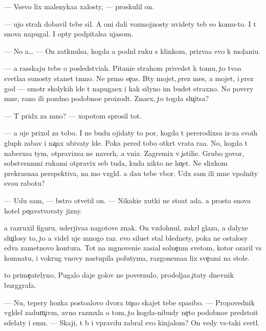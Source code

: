 \documentclass[10pt]{book}
\begin{document}
— Vsevo lix malenyka{\y}a xalosty, — proskulil on.

— {\C}ujo{\y} strah dobavil tebe sil. A oni dali vozmojnosty uvidety teb{\ia} {\y}e{\x}o komu-to. I t{\yi} snova napugal. I op{\ia}ty podpitalsa ujasom.

— No {\y}a… — On zatknulsa, kogda {\y}a podn{\ia}l ruku s klinkom, priz{\yi}va{\y}a {\y}evo k mol{\c}ani{\y}u.

— {\Y}a rasskaju tebe o posledstvi{\y}ah. Pitani{\y}e strahom privedet k tomu, {\c}to tvo{\y}a svetla{\y}a su{\x}nosty stanet t{\e}mno{\y}. Ne pr{\ia}mo se{\y}{\c}as. B{\yi}ty mojet, {\c}erez mes{\ia}{\q}, a mojet, i {\c}erez god — smotr{\ia} skolykih l{\iu}de{\y} t{\yi} napuga{\y}ex i kak silyno im budet straxno. No povery mne, rano ili pozdno podobno{\y}e proizo{\y}d{\e}t. Zna{\y}ex, {\c}to togda slu{\c}itsa?

— T{\yi} prid{\e}x za mno{\y}? — xopotom sprosil tot.

— {\Y}a uje prixol za tobo{\y}. I ne budu ojidaty to{\y} por{\yi}, kogda t{\yi} pererodixsa iz-za svo{\y}ih glup{\yi}h zabav i na{\c}n{\e}x ubivaty l{\iu}de{\y}. Poka pered tobo{\y} otkr{\yi}t{\yi} vrata ra{\y}a. No, kogda t{\yi} naber{\e}xsa tym{\yi}, otpravixsa ne naverh, a vniz. Zagremix v {\c}istili{\x}e. Grubo govor{\ia}, sobstvenn{\yi}mi rukami otpravix seb{\ia} tuda, kuda nikto ne ho{\c}et. Ne slixkom prekrasna{\y}a perspektiva, na mo{\y} vzgl{\ia}d. {\Y}a da{\y}u tebe v{\yi}bor. U{\y}d{\e}x sam ili mne v{\yi}polnity svo{\y}u rabotu?

— U{\y}du sam, — b{\yi}stro otvetil on. — Nikaki{\y}e xutki ne sto{\y}at ada. {\Y}a prosto snova hotel po{\c}uvstvovaty jizny.

{\Y}a razruxil figuru, uderjiva{\y}a nagotove znak. On vzdohnul, zakr{\yi}l glaza, a dalyxe slu{\c}ilosy to, {\c}to {\y}a videl uje mnogo raz. {\Y}evo siluet stal blednety, poka ne ostalosy {\y}edva zametnovo kontura. Tot na mgnoveni{\y}e zasi{\y}al solne{\c}n{\yi}m svetom, kotor{\yi}{\y} ozaril vs{\iu} komnatu, i vokrug vnovy nastupila polutyma, razgon{\ia}{\y}ema{\y}a lix sve{\c}ami na stole.

{\C}to prime{\c}atelyno, Pugalo daje golov{\yi} ne povernulo, prodolja{\y}a {\c}itaty dnevnik burggrafa.

— Nu, tepery hoz{\ia}{\y}ka posto{\y}alovo dvora to{\c}no skajet tebe spasibo. — Propovednik v{\yi}gl{\ia}del zadum{\c}iv{\yi}m, {\y}avno razm{\yi}xl{\ia}{\y}a o tom, {\c}to kogda-nibudy ne{\c}to podobno{\y}e predsto{\y}it sdelaty i {\y}emu. — Skaji, t{\yi} b{\yi} i vpravdu zabral {\y}evo kinjalom? On vedy vs{\e}-taki svetl{\yi}{\y}.
\end{document}
